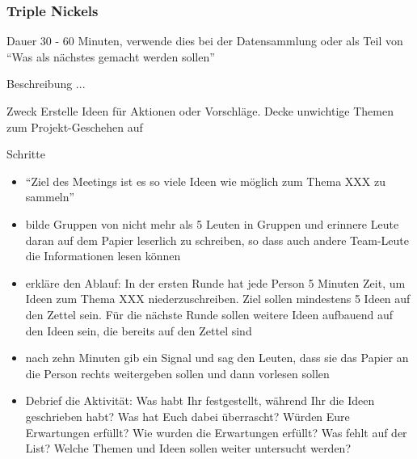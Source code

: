 \subsubsection{Triple Nickels}
\begin{Beschreibungfett}[Beschreibung]
  \item [Dauer] 30 - 60 Minuten, verwende dies bei der Datensammlung oder als Teil von \enquote{Was als nächstes gemacht werden sollen}
  \item [Beschreibung] ...
  \item [Zweck] Erstelle Ideen für Aktionen oder Vorschläge. Decke unwichtige Themen zum
    Projekt-Geschehen auf
  \item [Schritte]
    \begin{itemize}
      \item \enquote{Ziel des Meetings ist es so viele Ideen wie möglich zum Thema XXX zu sammeln}
      \item bilde Gruppen von nicht mehr als 5 Leuten in Gruppen und erinnere Leute daran auf dem
        Papier leserlich zu schreiben, so dass auch andere Team-Leute die Informationen lesen
        können
      \item erkläre den Ablauf: In der ersten Runde hat jede Person 5 Minuten Zeit, um Ideen zum
        Thema XXX niederzuschreiben. Ziel sollen mindestens 5 Ideen auf den Zettel sein. Für die
        nächste Runde sollen weitere Ideen aufbauend auf den Ideen sein, die bereits auf den
        Zettel sind
      \item nach zehn Minuten gib ein Signal und sag den Leuten, dass sie das Papier an die
        Person rechts weitergeben sollen und dann vorlesen sollen
      \item Debrief die Aktivität: Was habt Ihr festgestellt, während Ihr die Ideen geschrieben
        habt? Was hat Euch dabei überrascht? Würden Eure Erwartungen erfüllt? Wie wurden die
        Erwartungen erfüllt? Was fehlt auf der List? Welche Themen und Ideen sollen weiter
        untersucht werden?
    \end{itemize}
\end{Beschreibungfett}


